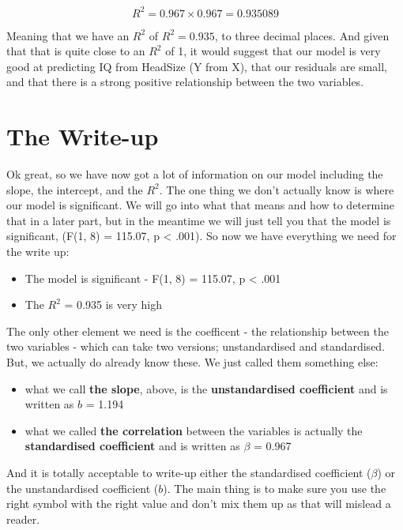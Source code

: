 \documentclass[
  oneside]{book}
\providecommand{\tightlist}{%
  \setlength{\itemsep}{0pt}\setlength{\parskip}{0pt}}
\begin{document}
\[R^2 = 0.967 \times 0.967 = 0.935089\]

Meaning that we have an \(R^2\) of \(R^2 = 0.935\), to three decimal places. And given that that is quite close to an \(R^2\) of 1, it would suggest that our model is very good at predicting IQ from HeadSize (Y from X), that our residuals are small, and that there is a strong positive relationship between the two variables.

\hypertarget{the-write-up-1}{%
\section{The Write-up}\label{the-write-up-1}}

Ok great, so we have now got a lot of information on our model including the slope, the intercept, and the \(R^2\). The one thing we don't actually know is where our model is significant. We will go into what that means and how to determine that in a later part, but in the meantime we will just tell you that the model is significant, (F(1, 8) = 115.07, p \textless{} .001). So now we have everything we need for the write up:

\begin{itemize}
\tightlist
\item
  The model is significant - F(1, 8) = 115.07, p \textless{} .001
\item
  The \(R^2\) = 0.935 is very high
\end{itemize}

The only other element we need is the coefficent - the relationship between the two variables - which can take two versions; unstandardised and standardised. But, we actually do already know these. We just called them something else:

\begin{itemize}
\tightlist
\item
  what we call \textbf{the slope}, above, is the \textbf{unstandardised coefficient} and is written as \(b\) = 1.194
\item
  what we called \textbf{the correlation} between the variables is actually the \textbf{standardised coefficient} and is written as \(\beta\) = 0.967
\end{itemize}

And it is totally acceptable to write-up either the standardised coefficient (\(\beta\)) or the unstandardised coefficient (\(b\)). The main thing is to make sure you use the right symbol with the right value and don't mix them up as that will mislead a reader.
\end{document}
